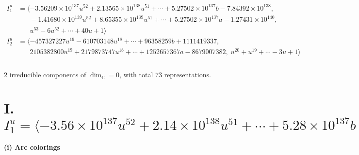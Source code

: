 \documentclass[1p]{elsarticle_modified}
\theoremstyle{definition}
\begin{document}
\begin{align*}
I^u_{1}&=\langle 
-3.56209\times10^{137} u^{52}+2.13565\times10^{138} u^{51}+\cdots+5.27502\times10^{137} b-7.84392\times10^{138},\\
\phantom{I^u_{1}}&\phantom{= \langle  }-1.41680\times10^{139} u^{52}+8.65355\times10^{139} u^{51}+\cdots+5.27502\times10^{137} a-1.27431\times10^{140},\\
\phantom{I^u_{1}}&\phantom{= \langle  }u^{53}-6 u^{52}+\cdots+40 u+1\rangle \\
I^u_{2}&=\langle 
-457327227 u^{19}-610703148 u^{18}+\cdots+96358259 b+1111419337,\\
\phantom{I^u_{2}}&\phantom{= \langle  }2105382800 u^{19}+2179873747 u^{18}+\cdots+1252657367 a-8679007382,\;u^{20}+u^{19}+\cdots-3 u+1\rangle \\
\\
\end{align*}
\raggedright * 2 irreducible components of $\dim_{\mathbb{C}}=0$, with total 73 representations.\\
\newpage
\renewcommand{\arraystretch}{1}
\centering \section*{I. $I^u_{1}= \langle -3.56\times10^{137} u^{52}+2.14\times10^{138} u^{51}+\cdots+5.28\times10^{137} b-7.84\times10^{138},\;-1.42\times10^{139} u^{52}+8.65\times10^{139} u^{51}+\cdots+5.28\times10^{137} a-1.27\times10^{140},\;u^{53}-6 u^{52}+\cdots+40 u+1 \rangle$}
\flushleft \textbf{(i) Arc colorings}\\
\end{document}
